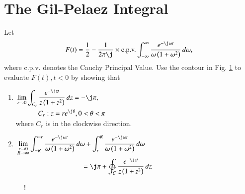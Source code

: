 \documentclass[journal,12pt,twocolumn]{IEEEtran}
\begin{document}
\section{The Gil-Pelaez Integral}
\begin{problem}
Let
\begin{equation}
\label{eq:gil}
F(t) = \frac{1}{2}-\frac{1}{2\pi\j}\times \text{c.p.v.}\int_{-\infty}^{\infty}\frac{e^{-\j\omega t}}{\omega\brak{1+\omega^2}}\,d\omega,
\end{equation}
where c.p.v. denotes the Cauchy Principal Value. Use the contour in Fig. \ref{fig:origin_contour} to evaluate $F(t), t < 0$
by showing that
\begin{enumerate}
\setlength\itemsep{0.5em}
\item
$\begin{multlined}[t]
\lim_{r\to 0}\int_{C_r}\frac{e^{-\j zt}}{z\brak{1+z^2}}\,dz = -\j\pi, 
\\
C_r: z = re^{\j\theta}, 0 < \theta < \pi
\end{multlined}$
\\
where $C_r$ is in the clockwise direction.
\item 
$\begin{multlined}[t]
\lim_{\substack{r\to 0 \\ R \to \infty}}\int_{-R}^{-r}\frac{e^{-\j\omega t}}{\omega\brak{1+\omega^2}}\,d\omega
+
\int_{r}^{R}\frac{e^{-\j\omega t}}{\omega\brak{1+\omega^2}}\,d\omega 
\\
= \j\pi + \ointctrclockwise_{C}\frac{e^{-\j zt}}{z\brak{1+z^2}}\,dz
\end{multlined}$
\end{enumerate}
\end{problem}	
%
\begin{figure}[!h]
\centering
\resizebox {\columnwidth} {!} {

}
\caption{}
\label{fig:origin_contour}
\end{figure}
\end{document}
